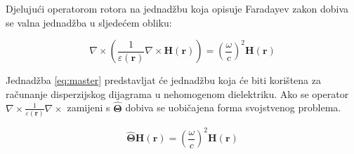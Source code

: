 \documentclass[utf8, seminar]{fer}
\begin{document}
Djelujući operatorom rotora na jednadžbu koja opisuje Faradayev zakon dobiva
se valna jednadžba u sljedećem obliku:

\begin{equation} \label{eq:master}
	\nabla \times \left(\frac{1}{\varepsilon(\mathbf{r})}\nabla
			\times \mathbf{H}(\mathbf{r}) \right)
	= \left( \frac{\omega}{c} \right)^2 \mathbf{H}(\mathbf{r})
\end{equation}

Jednadžba \ref{eq:master} predstavljat će jednadžbu koja će biti korištena za
računanje disperzijskog dijagrama u nehomogenom dielektriku.
Ako se operator ${\nabla \times \frac{1}{\varepsilon(\mathbf{r})} \nabla \times}$
zamijeni s $\hat{\mathbf{\Theta}}$ dobiva se uobičajena forma svojstvenog
problema.

\begin{equation}
	\hat{\mathbf{\Theta}} \mathbf{H}(\mathbf{r}) =
		\left( \frac{\omega}{c} \right)^2 \mathbf{H}(\mathbf{r})
\end{equation}
\end{document}

